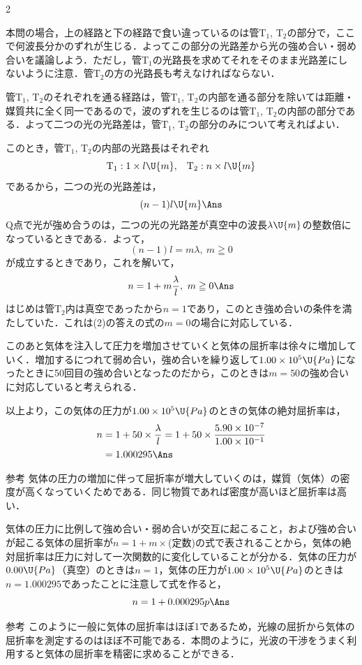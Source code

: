 \begin{multicols}{2}
\begin{sisin}
本問の場合，上の経路と下の経路で食い違っているのは管$\mathrm{T_1}$, $\mathrm{T_2}$の部分で，ここで何波長分かのずれが生じる．よってこの部分の光路差から光の強め合い・弱め合いを議論しよう．ただし，管$\mathrm{T_1}$の光路長を求めてそれをそのまま光路差にしないように注意．管$\mathrm{T_2}$の方の光路長も考えなければならない．
\end{sisin}
\KaiHead
\begin{komon}
 管$\mathrm{T_1}$, $\mathrm{T_2}$のそれぞれを通る経路は，管$\mathrm{T_1}$, $\mathrm{T_2}$の内部を通る部分を除いては距離・媒質共に全く同一であるので，波のずれを生じるのは管$\mathrm{T_1}$, $\mathrm{T_2}$の内部の部分である．よって二つの光の光路差は，管$\mathrm{T_1}$, $\mathrm{T_2}$の部分のみについて考えればよい．

       このとき，管$\mathrm{T_1}$, $\mathrm{T_2}$の内部の光路長はそれぞれ
       \[\mathrm{T_1}:1\times l\U{m},\hspace{3mm}\mathrm{T_2}:n\times l\U{m}\]
       であるから，二つの光の光路差は，
       \[(n-1)l\U{m}\Ans\]
 $\mathrm{Q}$点で光が強め合うのは，二つの光の光路差が真空中の波長$\lambda\U{m}$の整数倍になっているときである．よって，
       \[(n-1)l=m\lambda,\ m\geqq 0\]
       が成立するときであり，これを解いて，
       \[n=1+m\frac{\lambda}{l},\ m\geqq 0\Ans\]
 はじめは管$\mathrm{T_2}$内は真空であったから$n=1$であり，このとき強め合いの条件を満たしていた．これは(2)の答えの式の$m=0$の場合に対応している．

       このあと気体を注入して圧力を増加させていくと気体の屈折率は徐々に増加していく．増加するにつれて弱め合い，強め合いを繰り返して$1.00\times 10^5\U{Pa}$になったときに50回目の強め合いとなったのだから，このときは$m=50$の強め合いに対応していると考えられる．

       以上より，この気体の圧力が$1.00\times 10^5\U{Pa}$のときの気体の絶対屈折率は，
       \begin{align*}
       n&=1+50\times\frac{\lambda}{l}=1+50\times\frac{5.90\times 10^{-7}}{1.00\times 10^{-1}}\\
        &=1.000295\Ans
       \end{align*}
       \begin{bsHosoku}{参考}
       気体の圧力の増加に伴って屈折率が増大していくのは，媒質（気体）の密度が高くなっていくためである．同じ物質であれば密度が高いほど屈折率は高い．
       \end{bsHosoku}
 気体の圧力に比例して強め合い・弱め合いが交互に起こること，および強め合いが起こる気体の屈折率が$n=1+m\times$(定数)の式で表されることから，気体の絶対屈折率は圧力に対して一次関数的に変化していることが分かる．気体の圧力が$0.00\U{Pa}$（真空）のときは$n=1$，気体の圧力が$1.00\times 10^5\U{Pa}$のときは$n=1.000295$であったことに注意して式を作ると，
       \[n=1+0.000295p\Ans\]
       \begin{bsHosoku}{参考}
       このように一般に気体の屈折率はほぼ1であるため，光線の屈折から気体の屈折率を測定するのはほぼ不可能である．本問のように，光波の干渉をうまく利用すると気体の屈折率を精密に求めることができる．
       \end{bsHosoku}
\end{komon}


\end{multicols}
